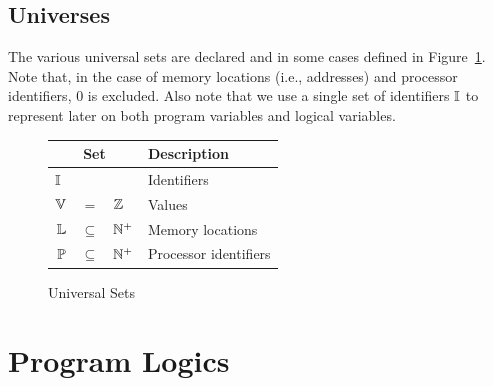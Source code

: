 \documentclass[11pt]{report}
\begin{document}
\subsection{Universes}
\label{sec:universes} 

The various universal sets are declared and in some cases defined in Figure~\ref{fig:universes}. Note that, in the case of memory locations (i.e., addresses) and processor identifiers, 0 is excluded. Also note that we use a single set of identifiers $\mathbb{I}$ to represent later on both program variables and logical variables.

\begin{figure}[ht]
  \centering
  \begin{tabular}{rcl|l}
    \multicolumn{3}{c}{Set} & Description \\ \hline
    \multicolumn{3}{l|}{$\mathbb{I}$} & Identifiers \\
    $\mathbb{V}$ & $=$ &  $\mathbb{Z}$ & Values \\
    $\mathbb{L}$ & $\subseteq$  &  $\mathbb{N}^+$ & Memory locations \\
    $\mathbb{P}$ &$\subseteq$ &  $\mathbb{N}^+$ & Processor identifiers
  \end{tabular}
  \caption{\label{fig:universes}Universal Sets}
\end{figure}


\section{Program Logics}
\label{sec:program-logics}
\end{document}
